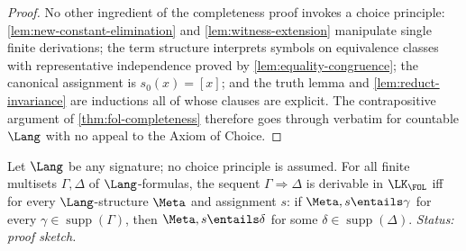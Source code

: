 \begin{proof}
No other ingredient of the completeness proof invokes a choice principle:
\cref{lem:new-constant-elimination} and
\cref{lem:witness-extension} manipulate single finite derivations; the
term structure interprets symbols on equivalence classes with
representative independence proved by
\cref{lem:equality-congruence}; the canonical assignment is
\(s_0(x)=[x]\); and the truth lemma and
\cref{lem:reduct-invariance} are inductions all of whose clauses are
explicit.  The
contrapositive argument of \cref{thm:fol-completeness} therefore goes
through verbatim for countable \(\Lang\) with no appeal to the Axiom of
Choice.
\end{proof}

\begin{theorem}
\label{thm:fol-lk-completeness}
Let \(\Lang\) be any signature; no choice principle is assumed.  For all
finite multisets \(\Gamma,\Delta\) of \(\Lang\)-formulas, the sequent
\(\Gamma\Rightarrow\Delta\) is derivable in \(\LK_{\FOL}\) iff for every
\(\Lang\)-structure \(\Meta\) and assignment \(s\): if
\(\Meta,s\entails\gamma\) for every
\(\gamma\in\operatorname{supp}(\Gamma)\), then
\(\Meta,s\entails\delta\) for some
\(\delta\in\operatorname{supp}(\Delta)\).
\textit{Status: proof sketch.}
\end{theorem}
